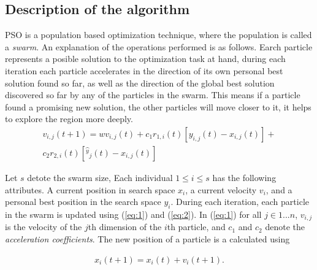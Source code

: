 \documentclass[journal]{IEEEtran}
\begin{document}
\subsection{Description of the algorithm}
PSO is a population based optimization technique, where the population is called a \textit{swarm}. An explanation of the operations performed is as follows. Earch particle represents a posible solution to the optimization task at hand, during each iteration each particle accelerates in the direction of its own personal best solution found so far, as well as the direction of the global best solution discovered so far by any of the particles in the swarm. This means if a particle found a promising new solution, the other particles will move closer to it, it helps to explore the region more deeply.
\\
\begin{equation} \label{eq:1}
    \begin{aligned}
    v_{i,j}(t+1)=wv_{i,j}(t)+c_1r_{1,i}(t)[y_{i,j}(t)-x_{i,j}(t)]+\\c_2r_{2,i}(t)[\hat{^y}_j(t)-x_{i,j}(t)]
    \end{aligned}
\end{equation}

Let $s$ detote the swarm size, Each individual $1 \leq i \leq s$ has the following attributes. A current position in search space $x_i$, a current velocity $v_i$, and a personal best position in the search space $y_i$. During each iteration, each particle in the swarm is updated using (\ref{eq:1}) and (\ref{eq:2}). In (\ref{eq:1}) for all $j\in1...n$, $v_{i,j}$ is the velocity of the $j$th dimension of the $i$th particle, and $c_1$ and $c_2$ denote the \textit{acceleration coefficients}. The new position of a particle is a calculated using

\begin{equation} \label{eq:2}
    \begin{aligned}
        x_i(t+1)=x_i(t)+v_i(t+1).
    \end{aligned}
\end{equation}
\end{document}

